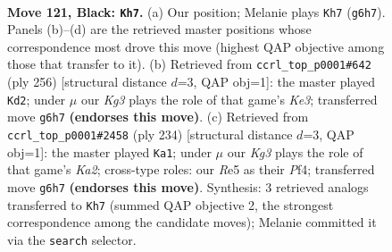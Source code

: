 \documentclass[11pt]{article}
\begin{document}
\begin{figure}[p]\centering
\begin{subfigure}{0.46\textwidth}\centering
\resizebox{\linewidth}{!}{%
\newchessgame
\chessboard[
  setfen={5K2/8/6k1/4r3/8/8/8/8 b - - 27 121},
  showmover=false,
  pgfstyle=straightmove, color=movearrow, markmove={g6-h7}
]}
\caption{}
\end{subfigure}\hfill
\begin{subfigure}{0.46\textwidth}\centering
\resizebox{\linewidth}{!}{%
\newchessgame
\chessboard[
  setfen={2R5/6k1/8/r7/8/4K3/8/8 w - - 2 129},
  showmover=false,
  pgfstyle=straightmove, color=movearrow, markmove={e3-d2}
]}
\caption{}
\end{subfigure}
\\[4pt]
\begin{subfigure}{0.46\textwidth}\centering
\resizebox{\linewidth}{!}{%
\newchessgame
\chessboard[
  setfen={8/8/8/8/1k3P2/8/K7/8 w - - 6 118},
  showmover=false,
  pgfstyle=straightmove, color=movearrow, markmove={a2-a1}
]}
\caption{}
\end{subfigure}\hfill

\caption{\textbf{Move 121, Black: \texttt{Kh7}.} (a) Our position; Melanie plays \texttt{Kh7} (\texttt{g6h7}). Panels (b)--(d) are the retrieved master positions whose correspondence most drove this move (highest QAP objective among those that transfer to it). (b) Retrieved from \texttt{ccrl\_top\_p0001\#642} (ply 256) [structural distance $d$=3, QAP obj=1]: the master played \texttt{Kd2}; under $\mu$ our \emph{Kg3} plays the role of that game's \emph{Ke3}; transferred move \texttt{g6h7} \textbf{(endorses this move)}. (c) Retrieved from \texttt{ccrl\_top\_p0001\#2458} (ply 234) [structural distance $d$=3, QAP obj=1]: the master played \texttt{Ka1}; under $\mu$ our \emph{Kg3} plays the role of that game's \emph{Ka2}; cross-type roles: our \emph{R}e5 as their \emph{P}f4; transferred move \texttt{g6h7} \textbf{(endorses this move)}. Synthesis: 3 retrieved analogs transferred to \texttt{Kh7} (summed QAP objective 2, the strongest correspondence among the candidate moves); Melanie committed it via the \texttt{search} selector.}
\label{fig:thought-m241}
\end{figure}

\clearpage
\end{document}
